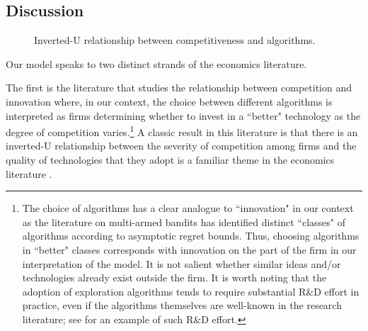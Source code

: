 
\subsection{Discussion}
\label{sec:intro-discussion}

\begin{figure}
\begin{center}

\caption{Inverted-U relationship between competitiveness and algorithms.}
\label{fig:inverted-U}
\end{center}
\end{figure}


 Our model speaks to two distinct strands of the economics literature.

The first is the literature that studies the relationship between competition and innovation where, in our context,  the choice between different algorithms is interpreted as firms determining whether to invest in a ``better" technology as the degree of competition varies.\footnote{The choice of algorithms has a clear analogue to ``innovation" in our context as the literature on multi-armed bandits has identified distinct ``classes" of algorithms according to asymptotic regret bounds. Thus, choosing algorithms in ``better" classes corresponds with innovation on the part of the firm in our interpretation of the model. It is not salient whether similar ideas and/or technologies already exist outside the firm. It is worth noting that the adoption of exploration algorithms tends to require substantial R\&D effort in practice, even if the algorithms themselves are well-known in the research literature; see \citet{MWT-WhitePaper-2016} for an example of such R\&D effort.} A classic result in this literature is that there is an inverted-U relationship between the severity of competition among firms and the quality of technologies that they adopt is a familiar theme in the economics literature \citep[\eg][]{Aghion-QJE05,Vives-08}.


